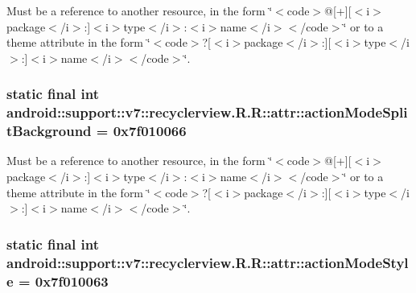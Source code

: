 Must be a reference to another resource, in the form \char`\"{}$<$code$>$@\mbox{[}+\mbox{]}\mbox{[}$<$i$>$package$<$/i$>$:\mbox{]}$<$i$>$type$<$/i$>$:$<$i$>$name$<$/i$>$$<$/code$>$\char`\"{} or to a theme attribute in the form \char`\"{}$<$code$>$?\mbox{[}$<$i$>$package$<$/i$>$:\mbox{]}\mbox{[}$<$i$>$type$<$/i$>$:\mbox{]}$<$i$>$name$<$/i$>$$<$/code$>$\char`\"{}. \hypertarget{classandroid_1_1support_1_1v7_1_1recyclerview_1_1_r_1_1attr_5382f784be4229568774332265e730e9}{
\subsubsection[{actionModeSplitBackground}]{\setlength{\rightskip}{0pt plus 5cm}static final int android::support::v7::recyclerview.R.R::attr::actionModeSplitBackground = 0x7f010066}}
\label{classandroid_1_1support_1_1v7_1_1recyclerview_1_1_r_1_1attr_5382f784be4229568774332265e730e9}


Must be a reference to another resource, in the form \char`\"{}$<$code$>$@\mbox{[}+\mbox{]}\mbox{[}$<$i$>$package$<$/i$>$:\mbox{]}$<$i$>$type$<$/i$>$:$<$i$>$name$<$/i$>$$<$/code$>$\char`\"{} or to a theme attribute in the form \char`\"{}$<$code$>$?\mbox{[}$<$i$>$package$<$/i$>$:\mbox{]}\mbox{[}$<$i$>$type$<$/i$>$:\mbox{]}$<$i$>$name$<$/i$>$$<$/code$>$\char`\"{}. \hypertarget{classandroid_1_1support_1_1v7_1_1recyclerview_1_1_r_1_1attr_edaef18e69a7c7d00b99d3cd6ed6cd1d}{
\subsubsection[{actionModeStyle}]{\setlength{\rightskip}{0pt plus 5cm}static final int android::support::v7::recyclerview.R.R::attr::actionModeStyle = 0x7f010063}}
\label{classandroid_1_1support_1_1v7_1_1recyclerview_1_1_r_1_1attr_edaef18e69a7c7d00b99d3cd6ed6cd1d}


